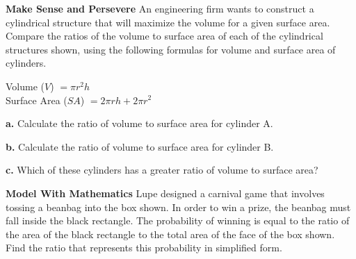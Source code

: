 \documentclass{article}
\newenvironment{practice}[2]{}{}
\newcommand{\uncertain}[2]{#1}
\begin{document}
\begin{practice}{35}{1}
\textbf{Make Sense and Persevere} An engineering firm wants to construct a cylindrical structure that will maximize the volume for a given surface area. Compare the ratios of the volume to surface area of each of the cylindrical structures shown, using the following formulas for volume and surface area of cylinders.

Volume ($V$) $= \pi r^2 h$ \\
Surface Area ($SA$) $= 2\pi rh + 2\pi r^2$

\qquad
{}

\textbf{a.} Calculate the ratio of volume to surface area for cylinder A.

\textbf{b.} Calculate the ratio of volume to surface area for cylinder B.

\textbf{c.} Which of these cylinders has a greater ratio of volume to surface area?
\end{practice}

\begin{practice}{36}{1}
\textbf{Model With Mathematics} Lupe designed a carnival game that involves tossing a beanbag into the box shown. In order to win a prize, the beanbag must fall inside the black rectangle. The probability of winning is equal to the ratio of the area of the black rectangle to the total area of the face of the box shown. Find the ratio that represents this probability in simplified form.

\end{practice}
\end{document}

